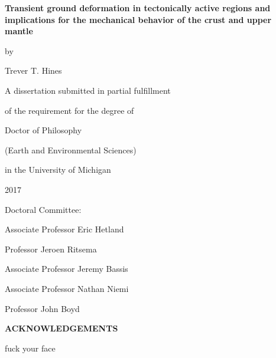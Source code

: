 \documentclass[letterpaper,12pt,oneside]{book}
\begin{document}
\frontmatter %

\begin{center}
\thispagestyle{empty} %
\vspace*{1.0in}
\textbf{\large{Transient ground deformation in tectonically active regions and implications for the mechanical behavior of the crust and upper mantle}}

\vspace*{0.25in}
by

\vspace*{0.25in}
Trever T. Hines 

\vspace*{2.0in}
A dissertation submitted in partial fulfillment

of the requirement for the degree of 

Doctor of Philosophy

(Earth and Environmental Sciences)

in the University of Michigan

2017
\end{center}
\vspace*{1.0in}
Doctoral Committee:

\vspace*{0.1in}
\hspace*{0.2in}
Associate Professor Eric Hetland

\hspace*{0.2in}
Professor Jeroen Ritsema

\hspace*{0.2in}
Associate Professor Jeremy Bassis

\hspace*{0.2in}
Associate Professor Nathan Niemi

\hspace*{0.2in}
Professor John Boyd

\newpage

\vspace*{1.0in}
\centerline{\large{\textbf{ACKNOWLEDGEMENTS}}}

fuck your face
\newpage

\tableofcontents
\listoffigures
\listoftables
\end{document}
